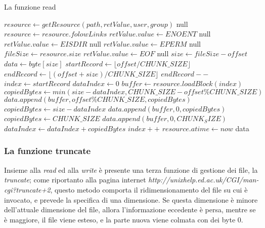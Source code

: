 \begin{algorithm}
\begin{algorithmic}[5]
\caption{La funzione read}
	\State $resource \gets getResource(path, retValue, user, group)$
		\State \Return null
	\EndIf
		\State $resource \gets resource.folowLinks$
	\EndIf
		\State $retValue.value \gets ENOENT$
		\State \Return null
		\State $retValue.value \gets EISDIR$
		\State \Return null
	\EndIf
		\State $retValue.value \gets EPERM$ 
		\State \Return null
	\EndIf
	\State $fileSize \gets resource.size$
		\State $retValue.value \gets EOF$ 
		\State \Return null
	\EndIf
		\State $size \gets fileSize - offset$
	\EndIf
	\State $data \gets byte[size]$
	\State $startRecord \gets \lfloor offset/CHUNK\_SIZE \rfloor$
	\State $endRecord \gets \lfloor (offset+size)/CHUNK\_SIZE \rfloor$
		\State $endRecord--$
	\EndIf
	\State $index \gets startRecord$
	\State $dataIndex \gets 0$
		\State $buffer \gets resource.loadBlock(index)$
			\State $copiedBytes \gets min(size-dataIndex, CHUNK\_SIZE - offset\%CHUNK\_SIZE)$
			\State $data.append(buffer, offset\%CHUNK\_SIZE, copiedBytes)$
			\State $copiedBytes \gets size-dataIndex$		
			\State $data.append(buffer, 0, copiedBytes)$	
		\Else
			\State $copiedBytes \gets CHUNK\_SIZE$
			\State $data.append(buffer, 0, CHUNK_SIZE)$
		\EndIf
			\State $dataIndex \gets dataIndex+copiedBytes$
			\State $index++$
	\EndWhile
	\State $resource.atime \gets now$
	\State \Return data
\EndFunction
\end{algorithmic}
\end{algorithm}

\newpage

\subsubsection{La funzione truncate}
Insieme alla \emph{read} ed alla \emph{write} è presente una terza funzione di gestione dei file, la \emph{truncate}; come riportanto alla pagina internet \emph{http://unixhelp.ed.ac.uk/CGI/man-cgi?truncate+2}, questo metodo comporta il ridimensionamento del file su cui è invocato, e prevede la specifica di una dimensione. Se questa dimensione è minore dell'attuale dimensione del file, allora l'informazione eccedente è persa, mentre se è maggiore, il file viene esteso, e la parte nuova viene colmata con dei byte 0.

